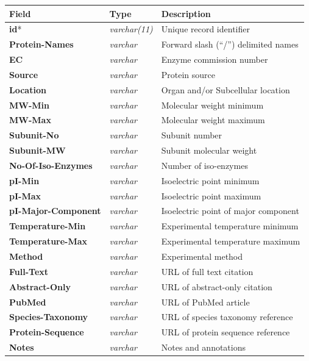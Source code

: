 \begin{table}[H]
\centering
\begin{tabular}{| l | l | l |}
\hline
\textbf{Field} & \textbf{Type} & \textbf{Description}\\
\hline
\textbf{id}* & \textit{varchar(11)} & Unique record identifier\\
\textbf{Protein-Names} & \textit{varchar} & Forward slash (``/'') delimited names\\
\textbf{EC} & \textit{varchar} & Enzyme commission number\\
\textbf{Source} & \textit{varchar} & Protein source\\
\textbf{Location} & \textit{varchar} & Organ and/or Subcellular location\\
\textbf{MW-Min} & \textit{varchar} & Molecular weight minimum\\
\textbf{MW-Max} & \textit{varchar} & Molecular weight maximum\\
\textbf{Subunit-No} & \textit{varchar} & Subunit number\\
\textbf{Subunit-MW} & \textit{varchar} & Subunit molecular weight\\
\textbf{No-Of-Iso-Enzymes} & \textit{varchar} & Number of iso-enzymes\\
\textbf{pI-Min} & \textit{varchar} & Isoelectric point minimum\\
\textbf{pI-Max} & \textit{varchar} & Isoelectric point maximum\\
\textbf{pI-Major-Component} & \textit{varchar} & Isoelectric point of major component\\
\textbf{Temperature-Min} & \textit{varchar} & Experimental temperature minimum\\
\textbf{Temperature-Max} & \textit{varchar} & Experimental temperature maximum\\
\textbf{Method} & \textit{varchar} & Experimental method\\
\textbf{Full-Text} & \textit{varchar} & URL of full text citation\\
\textbf{Abstract-Only} & \textit{varchar} & URL of abstract-only citation\\
\textbf{PubMed} & \textit{varchar} & URL of PubMed article\\
\textbf{Species-Taxonomy} & \textit{varchar} & URL of species taxonomy reference\\
\textbf{Protein-Sequence} & \textit{varchar} & URL of protein sequence reference\\
\textbf{Notes} & \textit{varchar} & Notes and annotations\\

\end{tabular}
\end{table}
